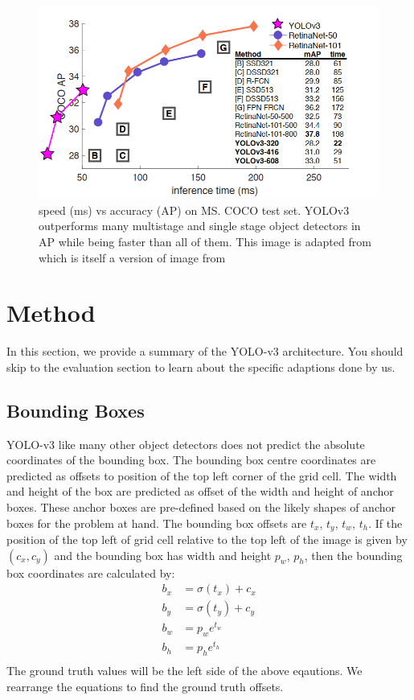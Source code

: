 \documentclass[10pt,twocolumn,letterpaper]{article}
\begin{document}
\begin{figure}[t]
	\begin{center}
		\includegraphics[width=1.0\linewidth]{object_detector_comparisons.png}
	\end{center}
	\caption{speed (ms) vs accuracy (AP) on MS. COCO test set. YOLOv3 outperforms many multistage and single stage object detectors in AP while being faster than all of them. This image is adapted from \cite{redmon2018yolov3} which is itself a version of image from \cite{retinaNet}}
	\label{fig:detector_comparison}
\end{figure}

\section{Method}
In this section, we provide a summary of the YOLO-v3 architecture. You should skip to the evaluation section to learn about the specific adaptions done by us.
\subsection{Bounding Boxes}
YOLO-v3 like many other object detectors does not predict the absolute coordinates of the bounding box. The bounding box centre coordinates are predicted as offsets to position of the top left corner of the grid cell. The width and height of the box are predicted as offset of the width and height of anchor boxes. These anchor boxes are pre-defined based on the likely shapes of anchor boxes for the problem at hand. The bounding box offsets are $t_x$, $t_y$, $t_w$, $t_h$. If the position of the top left of grid cell relative to the top left of the image is given by $(c_x, c_y)$ and the bounding box has width and height $p_w$, $p_h$, then the bounding box coordinates are calculated by: 
\begin{align*}
b_x &= \sigma(t_x) + c_x \\
b_y &= \sigma(t_y)  + c_y\\
b_w &= p_w e^{t_w}\\
b_h &= p_h e^{t_h}\\
\end{align*}
The ground truth values will be the left side of the above eqautions. We rearrange the equations to find the ground truth offsets.
\end{document}
